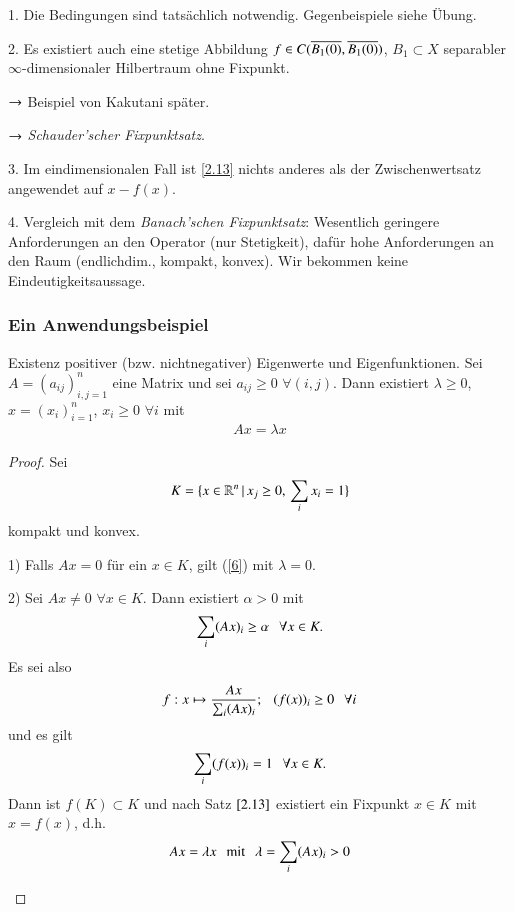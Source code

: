 \begin{remark}
    \begin{description}
    \item{1.}
    Die Bedingungen sind tatsächlich notwendig. Gegenbeispiele siehe Übung.
    \item{2.}
    Es existiert auch eine stetige Abbildung $f\in C(\overline{B_1(0)},\overline{B_1(0)})$, $B_1\subset X$ separabler
    $\infty$-dimensionaler Hilbertraum ohne Fixpunkt.
    \begin{description}
    \item{$\rightarrow$}
    Beispiel von Kakutani später.
    \item{$\rightarrow$}
    \textit{Schauder'scher Fixpunktsatz}.
    \end{description}
    \item{3.}
    Im eindimensionalen Fall ist \ref{2.13} nichts anderes als der Zwischenwertsatz angewendet auf
    $x-f(x)$.
    \item{4.}
    Vergleich mit dem \textit{Banach'schen Fixpunktsatz}: Wesentlich geringere Anforderungen an den
    Operator (nur Stetigkeit), dafür hohe Anforderungen an den Raum (endlichdim., kompakt, konvex).
    Wir bekommen keine Eindeutigkeitsaussage.
    \end{description}
\end{remark}

\subsubsection*{Ein Anwendungsbeispiel}

Existenz positiver (bzw. nichtnegativer) Eigenwerte und Eigenfunktionen. Sei $A=(a_{ij})_{i,j=1}^n$ eine
Matrix und sei $a_{ij}\geq 0$ $\forall (i,j)$. Dann existiert $\lambda\geq 0$, $x=(x_i)_{i=1}^n$,
$x_i\geq 0$ $\forall i$ mit
\begin{align}\label{6}
    Ax=\lambda x
\end{align}

\begin{proof}
    Sei 
    \[
        K=\{ x\in \mathbb{R}^n \, |\, x_j\geq 0, \, \sum_{i}x_i=1 \}
    \]
    kompakt und konvex.
    \begin{description}
        \item{1)}
        Falls $Ax=0$ für ein $x\in K$, gilt (\ref{6}) mit $\lambda=0$.
        \item{2)}
        Sei $Ax\neq 0$ $\forall x\in K$. Dann existiert $\alpha>0$ mit
        \[
            \sum_i(Ax)_i\geq \alpha \hspace{.25cm} \forall x\in K.
        \]
        Es sei also
        \[
            f:x\mapsto \frac{Ax}{\sum_i (Ax)_i}; \hspace{.25cm} (f(x))_i \geq 0 \hspace{.25cm} \forall i
        \]
        und es gilt
        \[
            \sum_i (f(x))_i=1 \hspace{.25cm} \forall x\in K.
        \]
        Dann ist $f(K)\subset K$ und nach Satz $\ref{2.13}$ existiert ein Fixpunkt $x\in K$ mit $x=f(x)$,
        d.h.
        \[
            Ax=\lambda x \hspace{.25cm} \text{mit} \hspace{.25cm} \lambda =\sum_i(Ax)_i >0
        \]
    \end{description}\[ \]
\end{proof}

